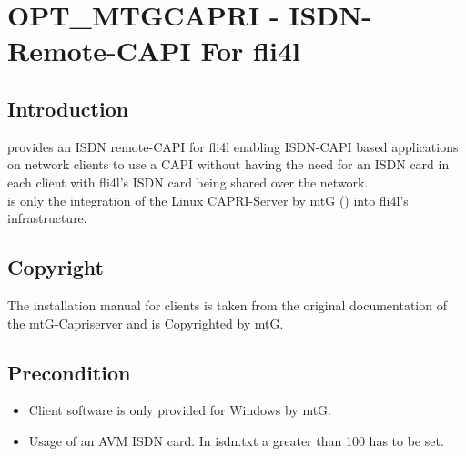{
\section {OPT\_MTGCAPRI - ISDN-Remote-CAPI For fli4l}
}

\subsection{Introduction}

 provides an ISDN remote-CAPI for fli4l enabling ISDN-CAPI
based applications on network clients to use a CAPI without having
the need for an ISDN card in each client with fli4l's ISDN card being shared
over the network.\\
 is only the integration of the Linux CAPRI-Server by mtG
() into fli4l's infrastructure.

\subsection{Copyright}
The installation manual for clients is taken from the original documentation of
the mtG-Capriserver and is Copyrighted by mtG.

\subsection{Precondition}
    \begin{itemize}
        \item Client software is only provided for Windows by mtG. \\
        \item Usage of an AVM ISDN card. In isdn.txt a
               greater than 100 has to be set.
   \end{itemize}


